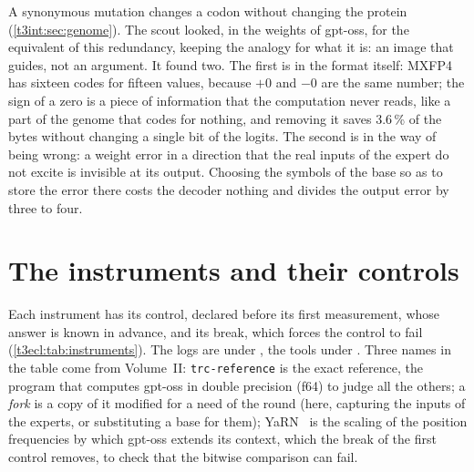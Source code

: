 \begin{enbref}
A synonymous mutation changes a codon without changing the protein (\cref{t3int:sec:genome}). The scout looked, in the weights of gpt-oss, for the equivalent of this redundancy, keeping the analogy for what it is: an image that guides, not an argument. It found two. The first is in the format itself: MXFP4 has sixteen codes for fifteen values, because $+0$ and $-0$ are the same number; the sign of a zero is a piece of information that the computation never reads, like a part of the genome that codes for nothing, and removing it saves 3.6\,\% of the bytes without changing a single bit of the logits. The second is in the way of being wrong: a weight error in a direction that the real inputs of the expert do not excite is invisible at its output. Choosing the symbols of the base so as to store the error there costs the decoder nothing and divides the output error by three to four.
\end{enbref}

\section{The instruments and their controls}\label{t3ecl:sec:instruments}

Each instrument has its control, declared before its first measurement, whose answer is known in advance, and its break, which forces the control to fail (\cref{t3ecl:tab:instruments}). The logs are under , the tools under . Three names in the table come from Volume~II: \texttt{trc-reference} is the exact reference, the program that computes gpt-oss in double precision (f64) to judge all the others; a \emph{fork} is a copy of it modified for a need of the round (here, capturing the inputs of the experts, or substituting a base for them); YaRN~\cite{peng2023yarn} is the scaling of the position frequencies by which gpt-oss extends its context, which the break of the first control removes, to check that the bitwise comparison can fail.


